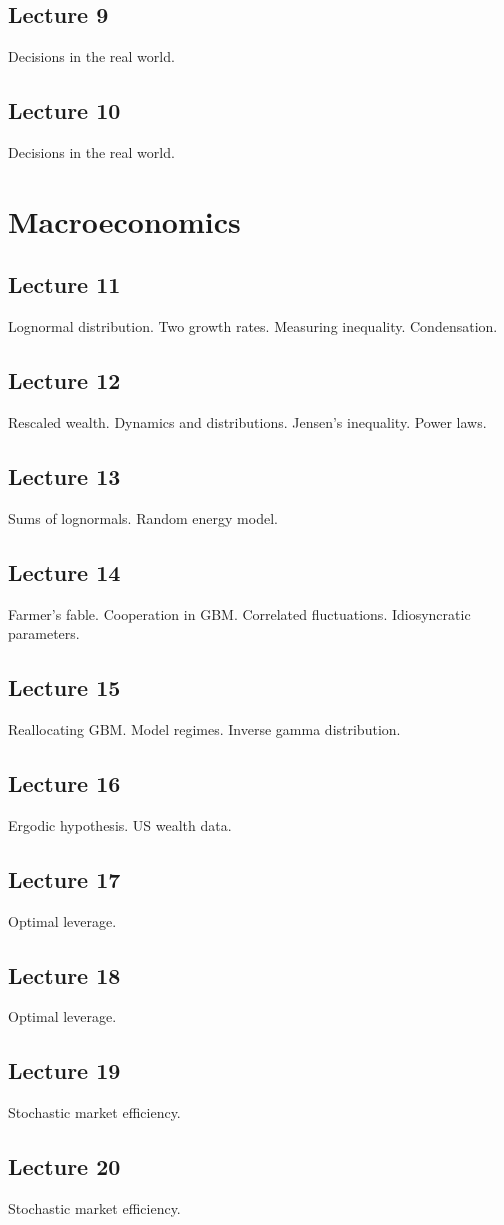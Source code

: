 \documentclass[12pt,a4paper]{article}
\begin{document}
\subsection*{Lecture 9}
Decisions in the real world.

\subsection*{Lecture 10}
Decisions in the real world.

\section*{Macroeconomics}
\subsection*{Lecture 11}
Lognormal distribution. Two growth rates. Measuring inequality. Condensation.

\subsection*{Lecture 12}
Rescaled wealth. Dynamics and distributions. Jensen's inequality. Power laws.

\subsection*{Lecture 13}
Sums of lognormals. Random energy model.

\subsection*{Lecture 14}
Farmer's fable. Cooperation in GBM. Correlated fluctuations. Idiosyncratic parameters.

\subsection*{Lecture 15}
Reallocating GBM. Model regimes. Inverse gamma distribution.

\subsection*{Lecture 16}
Ergodic hypothesis. US wealth data.

\subsection*{Lecture 17}
Optimal leverage.

\subsection*{Lecture 18}
Optimal leverage.

\subsection*{Lecture 19}
Stochastic market efficiency.

\subsection*{Lecture 20}
Stochastic market efficiency.
\end{document}
